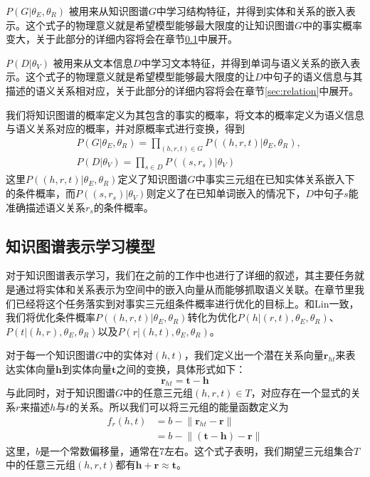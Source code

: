 $P(G|\theta_E, \theta_R)$ 被用来从知识图谱$G$中学习结构特征，并得到实体和关系的嵌入表示。这个式子的物理意义就是希望模型能够最大限度的让知识图谱$G$中的事实概率变大，关于此部分的详细内容将会在章节\ref{sec:kg}中展开。

$P(D|{\theta_V})$ 被用来从文本信息$D$中学习文本特征，并得到单词与语义关系的嵌入表示。这个式子的物理意义就是希望模型能够最大限度的让$D$中句子的语义信息与其描述的语义关系相对应，关于此部分的详细内容将会在章节\ref{sec:relation}中展开。

我们将知识图谱的概率定义为其包含的事实的概率，将文本的概率定义为语义信息与语义关系对应的概率，并对原概率式进行变换，得到
\begin{align}
 &P(G|{\theta_E,\theta_R})  = \prod_{(h,r,t) \in G}P((h, r, t)|{\theta_E, \theta_R}), \\
 &P(D|{\theta_V})  = \prod_{s \in D}P((s, r_s)|{\theta_V})
\end{align}
这里$P((h, r, t)|{\theta_E,\theta_R})$定义了知识图谱$G$中事实三元组在已知实体关系嵌入下的条件概率，而$P((s, r_s)|{\theta_V})$则定义了在已知单词嵌入的情况下，$D$中句子$s$能准确描述语义关系$r_s$的条件概率。

\subsection{知识图谱表示学习模型}
\label{sec:kg}

对于知识图谱表示学习，我们在之前的工作中也进行了详细的叙述，其主要任务就是通过将实体和关系表示为空间中的嵌入向量从而能够抓取语义关联。在章节\label{sec:joint}里我们已经将这个任务落实到对事实三元组条件概率进行优化的目标上。和Lin\cite{Lin2016Knowledge}一致，我们将优化条件概率$P((h, r, t)|{\theta_E, \theta_R})$转化为优化$P(h|(r, t),{\theta_E, \theta_R})$、$P(t|(h, r),{\theta_E, \theta_R})$以及$P(r|(h, t),{\theta_E, \theta_R})$。

对于每一个知识图谱$G$中的实体对$(h, t)$，我们定义出一个潜在关系向量$\mathbf{r}_{ht}$来表达实体向量$\mathbf{h}$到实体向量$\mathbf{t}$之间的变换，具体形式如下：
\begin{equation}
\textbf{r}_{ht} = \textbf{t} - \textbf{h}
\end{equation}
与此同时，对于知识图谱$G$中的任意三元组$(h, r, t) \in T$，对应存在一个显式的关系$r$来描述$h$与$t$的关系。所以我们可以将三元组的能量函数定义为
\begin{align}
\label{eq:kg_distance}
f_r(h, t) & = b - \lVert \textbf{r}_{ht} - \textbf{r} \rVert  
\\\nonumber
		& = b - \lVert (\textbf{t} - \textbf{h}) - \textbf{r}  \rVert
\end{align}
这里，$b$是一个常数偏移量，通常在$7$左右。这个式子表明，我们期望三元组集合$T$中的任意三元组$(h, r, t)$都有$\textbf{h} + \textbf{r} \approx \textbf{t}$。

